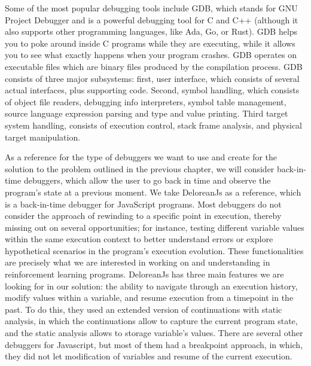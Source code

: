 Some of the most popular debugging tools include \ac{GDB}\cite{stallman2011debugging}, 
which stands for GNU Project Debugger and is a powerful 
debugging tool for C and C++ (although it also supports other programming languages,
like Ada, Go, or Rust). GDB helps you to poke around inside C programs while 
they are executing, while it allows you to see what exactly happens when your program 
crashes. \ac{GDB} operates on executable files which are binary files produced by the 
compilation process. \ac{GDB} consists of three major subsystems: first, user interface, which 
consists of several actual interfaces, plus supporting code. Second, symbol handling, 
which consists of object file readers, debugging info interpreters, symbol table 
management, source language expression parsing and type and value printing. Third target 
system handling, consists of execution control, stack frame analysis, and 
physical target manipulation\cite{stallman2011debugging}.

As a reference for the type of debuggers we want to use and create for the solution 
to the problem outlined in the previous chapter, we will consider back-in-time 
debuggers, which allow the user to go back in time and observe the program's state 
at a previous moment. We take DeloreanJs\cite{delorean23} as a reference, 
which is a back-in-time debugger for JavaScript programs. Most debuggers do not 
consider the approach of rewinding to a specific point in execution, thereby 
missing out on several opportunities; for instance, testing different variable 
values within the same execution context to better understand errors or explore 
hypothetical scenarios in the program's execution evolution. These functionalities 
are precisely what we are interested in working on and understanding in 
reinforcement learning programs. DeloreanJs has three main features we are looking 
for in our solution: the ability to navigate through an execution history, modify 
values within a variable, and resume execution from a timepoint in the 
past\cite{delorean23}. To do this, they used an extended version of continuations 
with static analysis, in which the continuations allow to capture the current program 
state, and the static analysis allows to storage variable's values. There are several 
other debuggers for Javascript, but most of them had a breakpoint approach, in which,
they did not let modification of variables and resume of the current execution.

